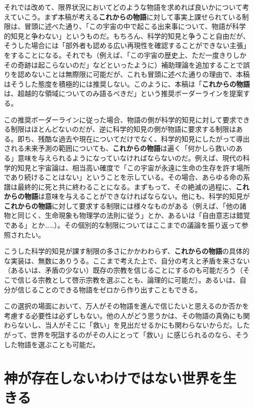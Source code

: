 \documentclass[8pt, a5paper]{ltjsarticle}
\begin{document}
それでは改めて、限界状況においてどのような物語を求めれば良いかについて考えていこう。まず本稿が考える\textbf{これからの物語}に対して事実上課せられている制限は、冒頭に述べた通り、「この宇宙の中で起こる出来事について、物語が科学的知見と争わない」というものだ。もちろん、科学的知見と争うこと自由だが、そうした場合には「部外者も認める広い再現性を確認することができない主張」をすることになる。それでも（例えば、「この宇宙の歴史上、ただ一度きりしかその奇跡は起こらないのだ」などといったように）補助理論を追加することで誤りを認めないことは無際限に可能だが、これも冒頭に述べた通りの理由で、本稿はそうした態度を積極的には推奨しない。このように、本稿は「\textbf{これからの物語}は、超越的な領域についてのみ語るべきだ」という推奨ボーダーラインを提案する。

この推奨ボーダーラインに従った場合、物語の側が科学的知見に対して要求できる制限はほとんどないのだが、逆に科学的知見の側が物語に要求する制限はある。即ち、残酷な過去や現在についてだけでなく、科学的知見にしたがって導出される未来予測の範囲についても、\textbf{これからの物語}は遍く「何かしら救いのある」意味を与えられるようになっていなければならないのだ。例えば、現代の科学的知見と宇宙論は、相当高い確度で「この宇宙が永遠に生命の生存を許す場所であり続けることはない」ということを示している。その場合、あらゆる命の系譜は最終的に死と共に終わることになる。まずもって、その絶滅の過程に、\textbf{これからの物語}は意味を与えることができなければならない。他にも、科学的知見が\textbf{これからの物語}に対して要求する制限には様々なものがある（例えば、「他の諸物と同じく、生命現象も物理学の法則に従う」とか、あるいは「自由意志は錯覚である」とか\ldots\ldots）。その個別的な制限についてはここまでの議論を振り返って参照されたい。

こうした科学的知見が課す制限の多さにかかわわらず、\textbf{これからの物語}の具体的な実装は、無数にありうる。ここまで考えた上で、自分の考えと矛盾を来さない（あるいは、矛盾の少ない）既存の宗教を信じることにするのも可能だろう（そこで信じる宗教として啓示宗教を選ぶことも、論理的に可能だ）。あるいは、自分が信じることのできる物語をゼロから作り出すこともできる。

この選択の場面において、万人がその物語を進んで信じたいと思えるのか否かを考慮する必要性は必ずしもない。他の人がどう思うかは、その物語の真偽にも関わらないし、当人がそこに「救い」を見出だせるかにも関わらないからだ。したがって、世界を呪詛するのがその人にとって「救い」に感じられるのなら、そうした物語を選ぶことも可能だ。

\section{神が存在しないわけではない世界を生きる}\label{ux795eux304cux5b58ux5728ux3057ux306aux3044ux308fux3051ux3067ux306fux306aux3044ux4e16ux754cux3092ux751fux304dux308b}
\end{document}
